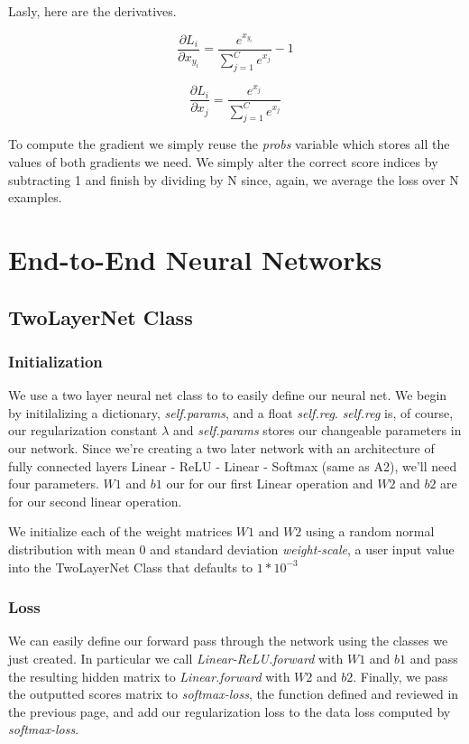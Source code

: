 \documentclass[12pt]{article}
\begin{document}
Lasly, here are the derivatives. 

\begin{equation}
    \frac{\partial L_{i}}{\partial x_{y_i}} = \frac{e^{x_{y_i}}}
    {\sum_{j=1}^C e^{x_{j}}} - 1
\end{equation}

\begin{equation}
    \frac{\partial L_{i}}{\partial x_j} = \frac{e^{x_{j}}}
    {\sum_{j=1}^C e^{x_j}}
\end{equation}

To compute the gradient we simply reuse the \emph{probs} variable which stores
all the values of both gradients we need. We simply alter the correct score
indices by subtracting 1 and finish by dividing by N since, again, we average the loss 
over N examples. 

\section{End-to-End Neural Networks}

\subsection{TwoLayerNet Class}

\subsubsection{Initialization}
We use a two layer neural net class to to easily define our neural net. We begin by initilalizing
a dictionary, \emph{self.params}, and a float \emph{self.reg}. \emph{self.reg} is, of course, 
our regularization constant $\lambda$ and \emph{self.params} stores our changeable parameters 
in our network. Since we're creating a two later network with an architecture of fully connected
layers Linear - ReLU - Linear - Softmax (same as A2), we'll need four parameters. $W1$ and $b1$ our 
for our first Linear operation and $W2$ and $b2$ are for our second linear operation. 

We initialize each of the weight matrices $W1$ and $W2$ using a random normal distribution 
with mean 0 and standard deviation \emph{weight-scale}, a user input value into the TwoLayerNet Class
that defaults to $1*10^{-3}$

\subsubsection{Loss}
We can easily define our forward pass through the network using the classes we just created. 
In particular we call \emph{Linear-ReLU.forward} with $W1$ and $b1$ and pass the resulting 
hidden matrix to \emph{Linear.forward} with $W2$ and $b2$. Finally, we pass the outputted scores
matrix to \emph{softmax-loss}, the function defined and reviewed in the previous page, and add 
our regularization loss to the data loss computed by \emph{softmax-loss}. 
\end{document}
